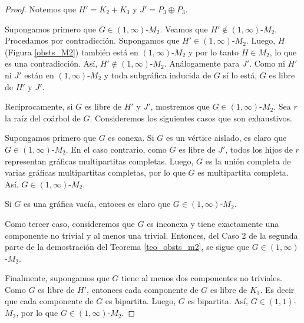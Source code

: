 \begin{proof}

Notemos que $H'=K_2 + K_3$ y $J'=\overline{P_3} \oplus \overline{P_3}$.

Supongamos primero que $G \in (1,\infty)$-$M_2$. Veamos que $H'\notin (1,\infty)$-$M_2$. Procedamos por contradicción. Supongamos que $H' \in (1,\infty)$-$M_2$. Luego, $H$ (Figura \ref{obsts_M2}) también está en $(1,\infty)$-$M_2$ y por lo tanto $H\in M_2$, lo que es una contradicción. Así,  $H'\notin (1,\infty)$-$M_2$. Análogamente para $J'$. Como ni $H'$ ni $J'$ están en $(1,\infty)$-$M_2$ y toda subgráfica inducida de $G$ sí lo está, $G$ es libre de $H'$ y $J'$.

Recíprocamente, si $G$ es libre de $H'$ y $J'$, mostremos que $G\in (1,\infty)$-$M_2$. Sea $r$ la raíz del coárbol de $G$. Consideremos los siguientes casos que son exhaustivos.

Supongamos primero que $G$ es conexa.  Si $G$ es un vértice aislado, es claro que $G \in (1,\infty)$-$M_2$. En el caso contrario, como $G$ es libre de $J'$, todos los hijos de $r$ representan gráficas multipartitas completas. Luego, $G$ es la unión completa de varias gráficas multipartitas completas, por lo que $G$ es multipartita completa. Así, $G \in (1,\infty)$-$M_2$.

Si $G$ es una gr\'afica vac\'ia, entoces es claro que $G \in (1,\infty)$-$M_2$.

Como tercer caso, consideremos que $G$ es inconexa y tiene exactamente una componente no trivial y al menos una trivial. Entonces, del Caso 2 de la segunda parte de la demostración del Teorema \ref{teo_obsts_m2}, se sigue que $G \in (1,\infty)$-$M_2$.

Finalmente, supongamos que $G$ tiene al menos dos componentes no triviales. Como $G$ es libre de $H'$, entonces cada componente de $G$ es libre de $K_3$. Es decir que cada componente de $G$ es bipartita. Luego, $G$ es bipartita. Así, $G \in (1,1)$-$M_2$, por lo que $G \in (1,\infty)$-$M_2$.

\end{proof}
